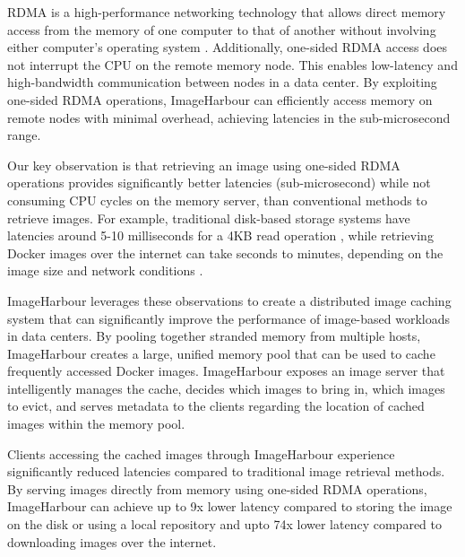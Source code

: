 RDMA is a high-performance networking technology that allows direct memory access from the memory of one computer to that of another without involving either computer's operating system \cite{kalia2016design}. Additionally, one-sided RDMA access does not interrupt the CPU on the remote memory node. This enables low-latency and high-bandwidth communication between nodes in a data center. By exploiting one-sided RDMA operations, ImageHarbour can efficiently access memory on remote nodes with minimal overhead, achieving latencies in the sub-microsecond range. 

Our key observation is that retrieving an image using one-sided RDMA operations provides significantly better latencies (sub-microsecond) while not consuming CPU cycles on the memory server, than conventional methods to retrieve images. For example, traditional disk-based storage systems have latencies around 5-10 milliseconds for a 4KB read operation \cite{yang2014don}, while retrieving Docker images over the internet can take seconds to minutes, depending on the image size and network conditions \cite{harter2016slacker}.

ImageHarbour leverages these observations to create a distributed image caching system that can significantly improve the performance of image-based workloads in data centers. By pooling together stranded memory from multiple hosts, ImageHarbour creates a large, unified memory pool that can be used to cache frequently accessed Docker images. ImageHarbour exposes an image server that intelligently manages the cache, decides which images to bring in, which images to evict, and serves metadata to the clients regarding the location of cached images within the memory pool.

Clients accessing the cached images through ImageHarbour experience significantly reduced latencies compared to traditional image retrieval methods. By serving images directly from memory using one-sided RDMA operations, ImageHarbour can achieve up to 9x lower latency compared to storing the image on the disk or using a local repository and upto 74x lower latency compared to downloading images over the internet.
